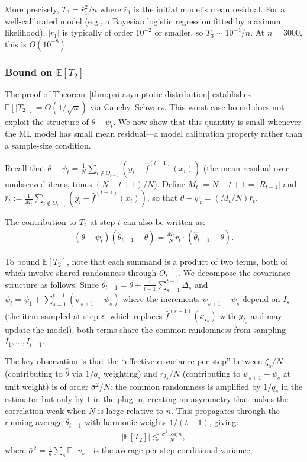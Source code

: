 \documentclass[11pt]{article}
\newcommand{\thetahat}{\hat{\theta}}
\newcommand{\fhat}{\hat{f}}
\begin{document}
More precisely, $T_3 = \bar{r}_1^2/n$ where $\bar{r}_1$ is the initial model's mean residual. For a well-calibrated model (e.g., a Bayesian logistic regression fitted by maximum likelihood), $|\bar{r}_1|$ is typically of order $10^{-2}$ or smaller, so $T_3 \sim 10^{-4}/n$. At $n = 3000$, this is $O(10^{-8})$.

\subsubsection*{Bound on $\mathbb{E}[T_2]$}

The proof of Theorem~\ref{thm:pai-asymptotic-distribution} establishes $\mathbb{E}[|T_2|] = O(1/\sqrt{n})$ via Cauchy--Schwarz. This worst-case bound does not exploit the structure of $\theta - \psi_t$. We now show that this quantity is small whenever the ML model has small mean residual---a model calibration property rather than a sample-size condition.

Recall that $\theta - \psi_t = \frac{1}{N}\sum_{i \notin O_{t-1}}(y_i - \fhat^{(t-1)}(x_i))$ (the mean residual over unobserved items, times $(N-t+1)/N$). Define $M_t := N - t + 1 = |R_{t-1}|$ and $\bar{r}_t := \frac{1}{M_t}\sum_{i \notin O_{t-1}}(y_i - \fhat^{(t-1)}(x_i))$, so that $\theta - \psi_t = (M_t/N)\bar{r}_t$.

The contribution to $T_2$ at step $t$ can also be written as:
\begin{align*}
    (\theta - \psi_t)(\thetahat_{t-1} - \theta) = \frac{M_t}{N}\bar{r}_t \cdot (\thetahat_{t-1} - \theta).
\end{align*}

To bound $\mathbb{E}[T_2]$, note that each summand is a product of two terms, both of which involve shared randomness through $O_{t-1}$. We decompose the covariance structure as follows. Since $\thetahat_{t-1} = \theta + \frac{1}{t-1}\sum_{s=1}^{t-1}\Delta_s$ and $\psi_t = \psi_1 + \sum_{s=1}^{t-1}(\psi_{s+1} - \psi_s)$ where the increments $\psi_{s+1} - \psi_s$ depend on $I_s$ (the item sampled at step $s$, which replaces $\fhat^{(s-1)}(x_{I_s})$ with $y_{I_s}$ and may update the model), both terms share the common randomness from sampling $I_1, \ldots, I_{t-1}$.

The key observation is that the ``effective covariance per step'' between $\zeta_s/N$ (contributing to $\thetahat$ via $1/q_s$ weighting) and $r_{I_s}/N$ (contributing to $\psi_{s+1} - \psi_s$ at unit weight) is of order $\bar{\sigma}^2/N$: the common randomness is amplified by $1/q_s$ in the estimator but only by $1$ in the plug-in, creating an asymmetry that makes the correlation weak when $N$ is large relative to $n$. This propagates through the running average $\thetahat_{t-1}$ with harmonic weights $1/(t-1)$, giving:
\begin{align}
\label{eq:T2-refined-bound}
    |\mathbb{E}[T_2]| \lesssim \frac{\bar{\sigma}^2 \log n}{N},
\end{align}
where $\bar{\sigma}^2 = \frac{1}{n}\sum_s \mathbb{E}[v_s]$ is the average per-step conditional variance.
\end{document}
